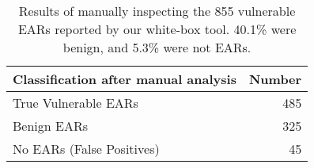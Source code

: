 \begin{table}[tb]
  \centering
  \begin{tabular}{lr}
    Classification after manual analysis & Number \\
    \hline
    True Vulnerable EARs  & 485 \\
    Benign EARs  & 325 \\
    No EARs (False Positives)  & 45 \\
    \hline
  \end{tabular}
  \caption[Results of manually inspecting all vulnerable EARs.]{Results of manually inspecting the 855 vulnerable EARs
    reported by our white-box tool. 40.1\% were benign, and 5.3\% were
    not EARs.}
\end{table}
